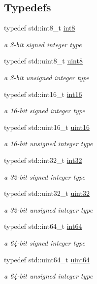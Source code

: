 \subsection*{Typedefs}
\begin{DoxyCompactItemize}
\item 
typedef std\-::int8\-\_\-t \hyperlink{namespacechaos_a557c5c30e5a935845432e60c617bd688}{int8}
\begin{DoxyCompactList}\small\item\em a 8-\/bit signed integer type \end{DoxyCompactList}\item 
typedef std\-::uint8\-\_\-t \hyperlink{namespacechaos_acbc0796d6929e3182cfd4f5c0176ab51}{uint8}
\begin{DoxyCompactList}\small\item\em a 8-\/bit unsigned integer type \end{DoxyCompactList}\item 
typedef std\-::int16\-\_\-t \hyperlink{namespacechaos_a5dd2297d965311a05d313aaba7752f55}{int16}
\begin{DoxyCompactList}\small\item\em a 16-\/bit signed integer type \end{DoxyCompactList}\item 
typedef std\-::uint16\-\_\-t \hyperlink{namespacechaos_a7957eb5f7af90c890c4b14dfd3c95c5f}{uint16}
\begin{DoxyCompactList}\small\item\em a 16-\/bit unsigned integer type \end{DoxyCompactList}\item 
typedef std\-::int32\-\_\-t \hyperlink{namespacechaos_aba819cd899114dc5873e32e7b26411c4}{int32}
\begin{DoxyCompactList}\small\item\em a 32-\/bit signed integer type \end{DoxyCompactList}\item 
typedef std\-::uint32\-\_\-t \hyperlink{namespacechaos_a8641b3ae4551f0b35570d4f9f4ec22d9}{uint32}
\begin{DoxyCompactList}\small\item\em a 32-\/bit unsigned integer type \end{DoxyCompactList}\item 
typedef std\-::int64\-\_\-t \hyperlink{namespacechaos_aa4cfe70894188e01134a2694db2eb2db}{int64}
\begin{DoxyCompactList}\small\item\em a 64-\/bit signed integer type \end{DoxyCompactList}\item 
typedef std\-::uint64\-\_\-t \hyperlink{namespacechaos_a9d62ad11fed4e3a5af70653b228ac910}{uint64}
\begin{DoxyCompactList}\small\item\em a 64-\/bit unsigned integer type \end{DoxyCompactList}\end{DoxyCompactItemize}


